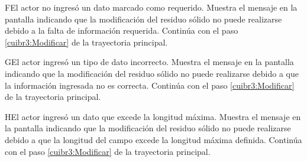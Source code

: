     \begin{UCtrayectoriaA}{F}{El actor no ingresó un dato marcado como requerido.}    
    \UCpaso[\UCsist] Muestra el mensaje  en la pantalla  indicando que la modificación del residuo sólido no puede realizarse debido a la falta de información requerida.
    \UCpaso[] Continúa con el paso \ref{cuibr3:Modificar} de la trayectoria principal.     
    \end{UCtrayectoriaA}
 
        \begin{UCtrayectoriaA}{G}{El actor ingresó un tipo de dato incorrecto.}    
    \UCpaso[\UCsist] Muestra el mensaje  en la pantalla  indicando que la modificación del residuo sólido no puede realizarse debido a que la información ingresada no es correcta.
    \UCpaso[] Continúa con el paso \ref{cuibr3:Modificar} de la trayectoria principal.     
    \end{UCtrayectoriaA}
    
            \begin{UCtrayectoriaA}{H}{El actor ingresó un dato que excede la longitud máxima.}    
    \UCpaso[\UCsist] Muestra el mensaje  en la pantalla  indicando que la modificación del residuo sólido no puede realizarse debido a que la longitud del campo excede la longitud máxima definida.
    \UCpaso[] Continúa con el paso \ref{cuibr3:Modificar} de la trayectoria principal.     
    \end{UCtrayectoriaA}
